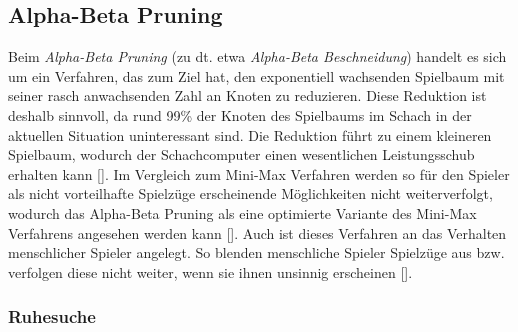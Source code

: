 \subsection{Alpha-Beta Pruning}

Beim \textit{Alpha-Beta Pruning} (zu dt. etwa \textit{Alpha-Beta Beschneidung}) handelt es sich um ein Verfahren, das zum Ziel hat, den exponentiell wachsenden Spielbaum mit seiner rasch anwachsenden Zahl an Knoten zu reduzieren.
Diese Reduktion ist deshalb sinnvoll, da rund 99\% der Knoten des Spielbaums im Schach in der aktuellen Situation uninteressant sind.
Die Reduktion führt zu einem kleineren Spielbaum, wodurch der Schachcomputer einen wesentlichen Leistungsschub erhalten kann [\cite{Paulsen2009}].
Im Vergleich zum Mini-Max Verfahren werden so für den Spieler als nicht vorteilhafte Spielzüge erscheinende Möglichkeiten nicht weiterverfolgt, wodurch das Alpha-Beta Pruning als eine optimierte Variante des Mini-Max Verfahrens angesehen werden kann [\cite{Knuth1975}].
Auch ist dieses Verfahren an das Verhalten menschlicher Spieler angelegt.
So blenden menschliche Spieler Spielzüge aus bzw. verfolgen diese nicht weiter, wenn sie ihnen unsinnig erscheinen [\cite{Paulsen2009}].


\subsubsection{Ruhesuche}


